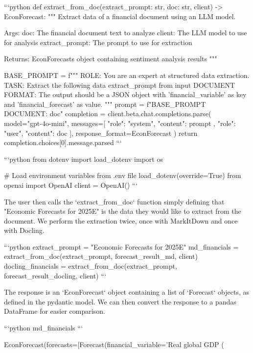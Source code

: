 ```python
def extract_from_doc(extract_prompt: str,  doc: str, client) -> EconForecast:
    """
    Extract data of a financial document using an LLM model.
    
    Args:
        doc: The financial document text to analyze
        client: The LLM model to use for analysis
        extract_prompt: The prompt to use for extraction
        
    Returns:
        EconForecasts object containing sentiment analysis results
    """

    BASE_PROMPT = f"""
    ROLE: You are an expert at structured data extraction. 
    TASK: Extract the following data {extract_prompt} from input DOCUMENT
    FORMAT: The output should be a JSON object with 'financial_variable' as key and 'financial_forecast' as value.
    """
    prompt = f"{BASE_PROMPT} \n\n DOCUMENT: {doc}"
    completion = client.beta.chat.completions.parse(
        model="gpt-4o-mini",
        messages=[
            {
                "role": "system",
                "content": prompt
            },
            {"role": "user", "content": doc}
        ],
        response_format=EconForecast
    )
    return completion.choices[0].message.parsed
```


```python
from dotenv import load_dotenv
import os

# Load environment variables from .env file
load_dotenv(override=True)
from openai import OpenAI
client = OpenAI()
```

The user then calls the `extract_from_doc` function simply defining that "Economic Forecasts for 2025E" is the data they would like to extract from the document. We perform the extraction twice, once with MarkItDown and once with Docling.


```python
extract_prompt = "Economic Forecasts for 2025E"
md_financials = extract_from_doc(extract_prompt, forecast_result_md, client)
docling_financials = extract_from_doc(extract_prompt, forecast_result_docling, client)
```

The response is an `EconForecast` object containing a list of `Forecast` objects, as defined in the pydantic model. We can then convert the response to a pandas DataFrame for easier comparison.


```python
md_financials
```




    EconForecast(forecasts=[Forecast(financial_variable='Real global GDP (%




